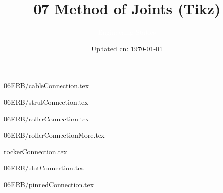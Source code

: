 \documentclass[9pt, xcolor={svgnames, x11names},professionalfonts]{beamer}
\title[07 MoJ Tikz]{\Huge 07 Method of Joints (Tikz)}
\subtitle[Engineering Statics]{\Large\textcolor{white}{Engineering Statics}}
\author{}
\date{\small Updated on: \today}
\def\scale{1}
\begin{document}

\begin{frame}[plain]    %
	\titlepage
\end{frame}



\begin{frame}{06ERB/cableConnection.tex}
	\def\scale{0.5}
	
\end{frame}

\begin{frame}{06ERB/strutConnection.tex}
	\def\scale{0.5}
	
\end{frame}

\begin{frame}{06ERB/rollerConnection.tex}
	\def\scale{0.45}
	
\end{frame}

\begin{frame}{06ERB/rollerConnectionMore.tex}
	\def\scale{0.35}	
	
\end{frame}

\begin{frame}{rockerConnection.tex}
	\def\scale{0.35}
	
\end{frame}

\begin{frame}{06ERB/slotConnection.tex}
	\def\scale{0.45}
		
\end{frame}

\begin{frame}{06ERB/pinnedConnection.tex}
	\def\scale{0.45}
		
\end{frame}
\end{document}
